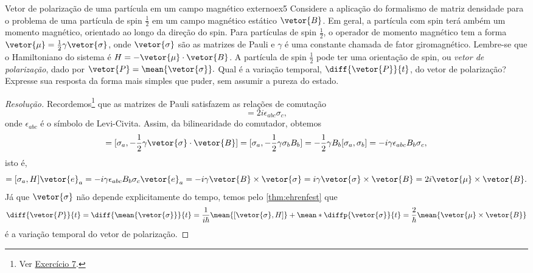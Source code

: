 \begin{exercício}{Vetor de polarização de uma partícula em um campo magnético externo}{ex5}
   Considere a aplicação do formalismo de matriz densidade para o problema de uma partícula de spin \(\frac12\) em um campo magnético estático \(\vetor{B}\). Em geral, a partícula com spin terá ambém um momento magnético, orientado ao longo da direção do spin. Para partículas de spin \(\frac12\), o operador de momento magnético tem a forma \(\vetor{\mu} = \frac12 \gamma \vetor{\sigma}\), onde \(\vetor{\sigma}\) são as matrizes de Pauli e \(\gamma\) é uma constante chamada de fator giromagnético. Lembre-se que o Hamiltoniano do sistema é \(H = -\vetor{\mu}\cdot \vetor{B}\).
   A partícula de spin \(\frac12\) pode ter uma orientação de spin, ou \emph{vetor de polarização}, dado por \(\vetor{P} = \mean{\vetor{\sigma}}.\) Qual é a variação temporal, \(\diff{\vetor{P}}{t}\), do vetor de polarização? Expresse sua resposta da forma mais simples que puder, sem assumir a pureza do estado.
\end{exercício}
\begin{proof}[Resolução]
   Recordemos\footnote{Ver \href{https://github.com/louisradial/4300429-grupos-e-tensores/releases/tag/lista1}{Exercício 7}.} que as matrizes de Pauli satisfazem as relações de comutação
   \begin{equation*}
      [\sigma_a, \sigma_b] = 2i \epsilon_{abc} \sigma_c,
   \end{equation*}
   onde \(\epsilon_{abc}\) é o símbolo de Levi-Civita. Assim, da bilinearidade do comutador, obtemos
   \begin{equation*}
      [\sigma_a, H] = [\sigma_a, - \frac12 \gamma \vetor{\sigma} \cdot \vetor{B}] = [\sigma_a, - \frac12 \gamma \sigma_b B_b] = - \frac12 \gamma B_b [\sigma_a, \sigma_b] = -i \gamma \epsilon_{abc} B_b \sigma_c,
   \end{equation*}
   isto é,
   \begin{equation*}
      [\vetor{\sigma}, H] = [\sigma_a, H]\vetor{e}_a = - i \gamma \epsilon_{abc} B_b \sigma_c \vetor{e}_a = -i \gamma \vetor{B} \times \vetor{\sigma} = i \gamma \vetor{\sigma} \times \vetor{B} = 2i \vetor{\mu} \times \vetor{B}.
   \end{equation*}
   Já que \(\vetor{\sigma}\) não depende explicitamente do tempo, temos pelo \cref{thm:ehrenfest} que
   \begin{equation*}
      \diff{\vetor{P}}{t} = \diff{\mean{\vetor{\sigma}}}{t} = \frac{1}{i \hbar} \mean{[\vetor{\sigma}, H]} + \mean*{\diffp{\vetor{\sigma}}{t}} = \frac{2}{\hbar} \mean{\vetor{\mu} \times \vetor{B}}
   \end{equation*}
   é a variação temporal do vetor de polarização.
\end{proof}
